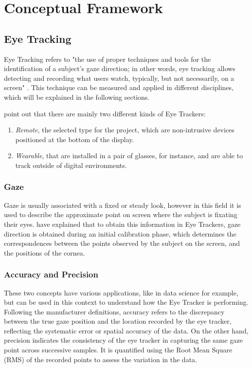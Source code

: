 \section{Conceptual Framework} 

\subsection{Eye Tracking}

Eye Tracking refers to "the use of proper techniques and tools for the identification of a subject's gaze direction; in other words, eye tracking allows detecting and recording what users watch, typically, but not necessarily, on a screen" \citep{inproc:eyetracking-2014}. This technique can be measured and applied in different disciplines, which will be explained in the following sections.

\cite{art:gaze-hci-2023} point out that there are mainly two different kinds of Eye Trackers:
\begin{enumerate}
    \item \textit{Remote}, the selected type for the project, which are non-intrusive devices positioned at the bottom of the display.
    \item \textit{Wearable}, that are installed in a pair of glasses, for instance, and are able to track outside of digital environments.
\end{enumerate}

\subsubsection{Gaze}

Gaze is usually associated with a fixed or steady look, however in this field it is used to describe the approximate point on screen where the subject is fixating their eyes. \cite{inproc:eyetracking-2014} have explained that to obtain this information in Eye Trackers, gaze direction is obtained during an initial calibration phase, which determines the correspondences between the points observed by the subject on the screen, and the positions of the cornea. 

\subsubsection{Accuracy and Precision}

These two concepts have various applications, like in data science for example, but can be used in this context to understand how the Eye Tracker is performing. Following the manufacturer definitions, accuracy refers to the discrepancy between the true gaze position and the location recorded by the eye tracker, reflecting the systematic error or spatial accuracy of the data. On the other hand, precision indicates the consistency of the eye tracker in capturing the same gaze point across successive samples. It is quantified using the Root Mean Square (RMS) of the recorded points to assess the variation in the data. \citep{misc:acc-prec-tobii-2023}


